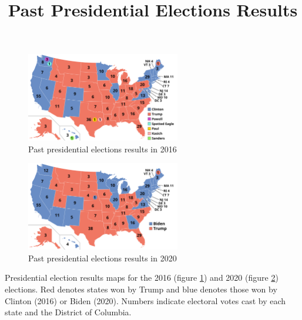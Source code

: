 \documentclass{article}
\begin{document}
\title{Past Presidential Elections Results}

\maketitle

\begin{figure}[H]
    \centering
    \includegraphics[width=0.6\textwidth]{ElectoralCollege2016.svg.png}
    \caption{Past presidential elections results in 2016}
    \label{fig:past_elections_2016}
\end{figure}

\begin{figure}[H]
    \centering
    \includegraphics[width=0.6\textwidth]{ElectoralCollege2020.svg.png}
    \caption{Past presidential elections results in 2020}
    \label{fig:past_elections_2020}
\end{figure}

Presidential election results maps for the 2016 (figure \ref{fig:past_elections_2016}) and 2020 (figure \ref{fig:past_elections_2020}) elections. 
Red denotes states won by Trump and blue denotes those won by Clinton (2016) or Biden (2020). 
Numbers indicate electoral votes cast by each state and the District of Columbia. 
\end{document}

